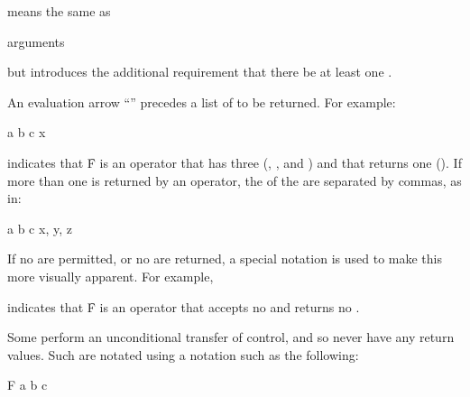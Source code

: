  {{\rest} }

\noindent means the same as

 {{\rest} arguments}

\noindent but introduces the additional requirement that there be 
at least one .

\endsubsubsubsection%


An evaluation arrow ``{\EV}'' precedes a list of  to be returned.
For example:

 {a b c} {x}

\noindent indicates that \f{F} is an operator that has three 
(\ie {}, , and ) and that returns one  (\ie {}).
If more than one  is returned by an operator, the  of the
 are separated by commas, as in:

 {a b c} {x, y, z}


If no  are permitted, or no  are returned, 
a special notation is used to make this more visually apparent.  For example,

 {\noargs} {\novalues}

indicates that \f{F} is an operator that accepts no  and returns
no .

\endsubsubsubsubsection%


Some  perform an unconditional transfer of control, and
so never have any return values.  Such  are notated using
a notation such as the following:

\DefunNoReturn F {a b c}

\endsubsubsubsubsection%

\endsubsubsubsection%

\endsubsubsection%

